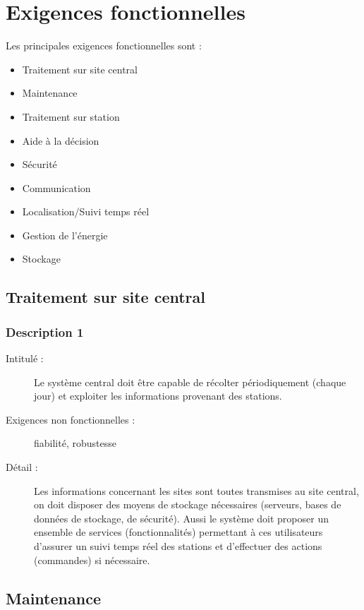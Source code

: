 \documentclass[11pt]{article}
\begin{document}
\section{Exigences fonctionnelles}

Les principales exigences fonctionnelles sont :
 \begin{itemize}
       \item Traitement sur site central
       \item Maintenance
       \item Traitement sur station
       \item Aide à la décision
       \item Sécurité
       \item Communication
       \item Localisation/Suivi temps réel
       \item Gestion de l'énergie
       \item Stockage
\end{itemize}


\subsection {Traitement sur site central }
\subsubsection {Description 1}
\begin{description}
           \item[Intitulé :] Le système central doit être capable de récolter périodiquement (chaque jour) et exploiter les informations provenant des stations.
           \item[Exigences non fonctionnelles :]  fiabilité, robustesse
           \item[Détail :]  Les informations concernant les sites sont toutes transmises au site central, on doit disposer des moyens
de stockage nécessaires (serveurs, bases de données de stockage, de sécurité). Aussi le système doit proposer un ensemble de services (fonctionnalités) permettant à ces utilisateurs d'assurer un suivi temps réel des stations et d'effectuer des actions (commandes) si nécessaire.
\end{description}


 \subsection {Maintenance}
\end{document}
